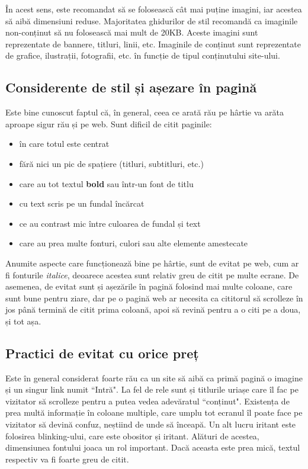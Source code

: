 \documentclass[12pt]{article} %
\begin{document}
În acest sens, este recomandat să se folosească cât mai puține imagini, iar acestea să
aibă dimensiuni reduse. Majoritatea ghidurilor de stil recomandă ca imaginile
non-conținut să nu folosească mai mult de 20KB. Aceste imagini sunt reprezentate de
bannere, titluri, linii, etc. Imaginile de conținut sunt reprezentate de grafice,
ilustrații, fotografii, etc. în funcție de tipul conținutului site-ului.


\subsection{Considerente de stil și așezare în pagină} %

Este bine cunoscut faptul că, în general, ceea ce arată rău pe hârtie va arăta aproape
sigur rău și pe web. Sunt dificil de citit paginile:
\begin{itemize}[nosep]  %
\item în care totul este centrat
\item fără nici un pic de spațiere (titluri, subtitluri, etc.)
\item care au tot textul \textbf{bold} sau într-un font de titlu
\item cu text scris pe un fundal încărcat
\item ce au contrast mic între culoarea de fundal și text
\item care au prea multe fonturi, culori sau alte elemente amestecate
\end{itemize}

Anumite aspecte care funcționează bine pe hârtie, sunt de evitat pe web, cum ar fi
fonturile \textit{italice}, deoarece acestea sunt relativ greu de citit pe multe ecrane.
De asemenea, de evitat sunt și așezările în pagină folosind mai multe coloane, care sunt
bune pentru ziare, dar pe o pagină web ar necesita ca cititorul să scrolleze în jos până
termină de citit prima coloană, apoi să revină pentru a o citi pe a doua, și tot așa.


\subsection{Practici de evitat cu orice preț} %

Este în general considerat foarte rău ca un site să aibă ca primă pagină o imagine și un
singur link numit ``Intră". La fel de rele sunt și titlurile uriașe care îl fac pe
vizitator să scrolleze pentru a putea vedea adevăratul ``conținut". Existența de prea
multă informație în coloane multiple, care umplu tot ecranul îl poate face pe vizitator
să devină confuz, neștiind de unde să înceapă. Un alt lucru iritant este folosirea
blinking-ului, care este obositor și iritant. Alături de acestea, dimensiunea fontului
joaca un rol important. Dacă aceasta este prea mică, textul respectiv va fi foarte greu
de citit.
\end{document}
